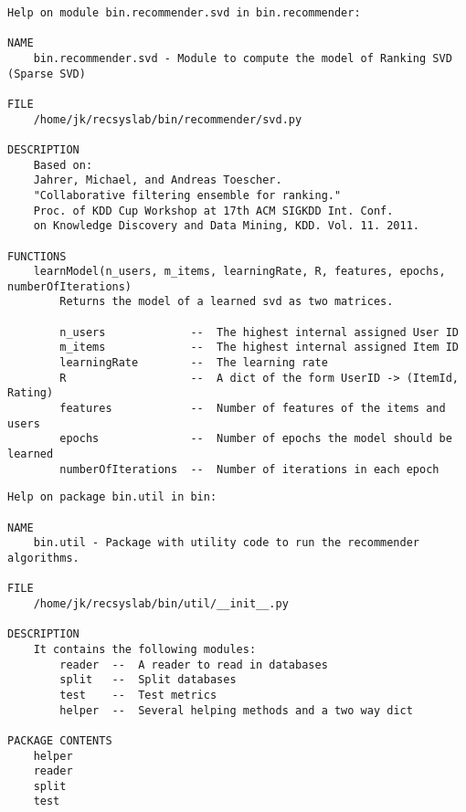 \begin{lstlisting}[style=docstring]
Help on module bin.recommender.svd in bin.recommender:

NAME
    bin.recommender.svd - Module to compute the model of Ranking SVD (Sparse SVD)

FILE
    /home/jk/recsyslab/bin/recommender/svd.py

DESCRIPTION
    Based on:
    Jahrer, Michael, and Andreas Toescher.
    "Collaborative filtering ensemble for ranking."
    Proc. of KDD Cup Workshop at 17th ACM SIGKDD Int. Conf.
    on Knowledge Discovery and Data Mining, KDD. Vol. 11. 2011.

FUNCTIONS
    learnModel(n_users, m_items, learningRate, R, features, epochs, numberOfIterations)
        Returns the model of a learned svd as two matrices.
        
        n_users             --  The highest internal assigned User ID
        m_items             --  The highest internal assigned Item ID
        learningRate        --  The learning rate
        R                   --  A dict of the form UserID -> (ItemId, Rating)
        features            --  Number of features of the items and users
        epochs              --  Number of epochs the model should be learned
        numberOfIterations  --  Number of iterations in each epoch
\end{lstlisting}

\begin{lstlisting}[style=docstring]
Help on package bin.util in bin:

NAME
    bin.util - Package with utility code to run the recommender algorithms.

FILE
    /home/jk/recsyslab/bin/util/__init__.py

DESCRIPTION
    It contains the following modules:
        reader  --  A reader to read in databases
        split   --  Split databases
        test    --  Test metrics
        helper  --  Several helping methods and a two way dict

PACKAGE CONTENTS
    helper
    reader
    split
    test
\end{lstlisting}

